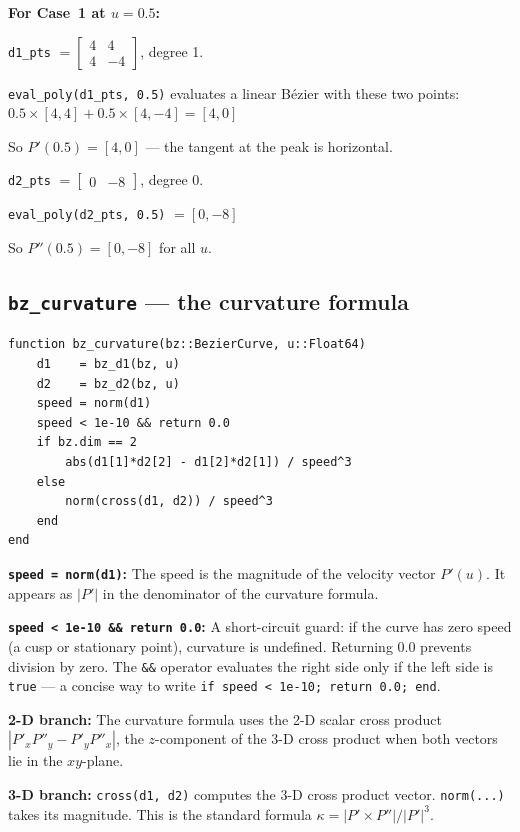 \documentclass[12pt, a4paper]{article}
\newcommand{\cd}[1]{\texttt{#1}}
\begin{document}
\begin{examplebox}
\textbf{For Case~1 at $u = 0.5$:}

\cd{d1\_pts} $= \begin{bmatrix}4&4\\4&-4\end{bmatrix}$, degree 1.

\cd{eval\_poly(d1\_pts, 0.5)} evaluates a linear
B\'ezier with these two points:
$0.5 \times [4,4] + 0.5 \times [4,-4] = [4, 0]$

So $P'(0.5) = [4, 0]$ --- the tangent at the peak
is horizontal. \checkmark

\cd{d2\_pts} $= \begin{bmatrix}0&-8\end{bmatrix}$, degree 0.

\cd{eval\_poly(d2\_pts, 0.5)} $= [0, -8]$

So $P''(0.5) = [0, -8]$ for all $u$. \checkmark
\end{examplebox}

\subsection{\texttt{bz\_curvature} --- the curvature formula}

\begin{verbatim}
function bz_curvature(bz::BezierCurve, u::Float64)
    d1    = bz_d1(bz, u)
    d2    = bz_d2(bz, u)
    speed = norm(d1)
    speed < 1e-10 && return 0.0
    if bz.dim == 2
        abs(d1[1]*d2[2] - d1[2]*d2[1]) / speed^3
    else
        norm(cross(d1, d2)) / speed^3
    end
end
\end{verbatim}

\textbf{\cd{speed = norm(d1)}:}
The speed is the magnitude of the velocity vector $P'(u)$.
It appears as $|P'|$ in the denominator of the curvature formula.

\textbf{\cd{speed < 1e-10 \&\& return 0.0}:}
A short-circuit guard: if the curve has zero speed
(a cusp or stationary point), curvature is undefined.
Returning 0.0 prevents division by zero.
The \cd{\&\&} operator evaluates the right side only if the
left side is \cd{true} --- a concise way to write
\cd{if speed < 1e-10; return 0.0; end}.

\textbf{2-D branch:}
The curvature formula uses the 2-D scalar cross product
$|P'_x P''_y - P'_y P''_x|$, the $z$-component of the
3-D cross product when both vectors lie in the $xy$-plane.

\textbf{3-D branch:}
\cd{cross(d1, d2)} computes the 3-D cross product vector.
\cd{norm(...)} takes its magnitude.
This is the standard formula $\kappa = |P' \times P''| / |P'|^3$.
\end{document}
